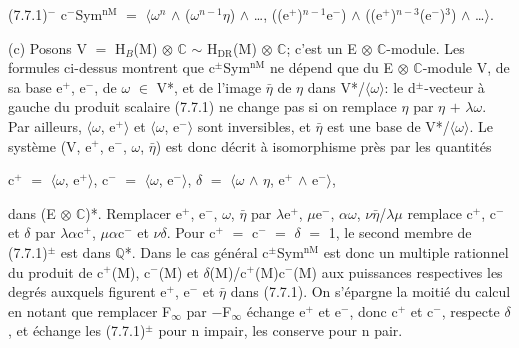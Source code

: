 \documentclass[10pt,twoside]{article}
\begin{document}
(7.7.1)\ensuremath{^{−}}    c\ensuremath{^{-}}Sym\ensuremath{^{\mathrm{nM}}} \ensuremath{=} \ensuremath{⟨}\ensuremath{ω}\ensuremath{^{n}} \ensuremath{∧} (\ensuremath{ω}\ensuremath{^{n−1}}\ensuremath{η}) \ensuremath{∧} …, ((e\ensuremath{^{+}})\ensuremath{^{n−1}}e\ensuremath{^{-}}) \ensuremath{∧} ((e\ensuremath{^{+}})\ensuremath{^{n−3}}(e\ensuremath{^{-}})\ensuremath{^{3}}) \ensuremath{∧} …\ensuremath{⟩}.\par
(c) Posons V \ensuremath{=} H\ensuremath{_{B}}(M) \ensuremath{⊗} \ensuremath{ℂ} \ensuremath{∼} H\ensuremath{_{\mathrm{DR}}}(M) \ensuremath{⊗} \ensuremath{ℂ}; c’est un E \ensuremath{⊗} \ensuremath{ℂ}-module. Les formules ci-dessus montrent que c\ensuremath{^{±}}Sym\ensuremath{^{\mathrm{nM}}} ne dépend que du E \ensuremath{⊗} \ensuremath{ℂ}-module V, de sa base e\ensuremath{^{+}}, e\ensuremath{^{-}}, de \ensuremath{ω} \ensuremath{∈} V*, et de l’image \ensuremath{\bar{η}} de \ensuremath{η} dans V*/\ensuremath{⟨}\ensuremath{ω}\ensuremath{⟩}: le d\ensuremath{^{±}}-vecteur à gauche du produit scalaire (7.7.1) ne change pas si on remplace \ensuremath{η} par \ensuremath{η} \ensuremath{+} \ensuremath{λ}\ensuremath{ω}. Par ailleurs, \ensuremath{⟨}\ensuremath{ω}, e\ensuremath{^{+}}\ensuremath{⟩} et \ensuremath{⟨}\ensuremath{ω}, e\ensuremath{^{-}}\ensuremath{⟩} sont inversibles, et \ensuremath{\bar{η}} est une base de V*/\ensuremath{⟨}\ensuremath{ω}\ensuremath{⟩}. Le système (V, e\ensuremath{^{+}}, e\ensuremath{^{-}}, \ensuremath{ω}, \ensuremath{\bar{η}}) est donc décrit à isomorphisme près par les quantités\par
c\ensuremath{^{+}} \ensuremath{=} \ensuremath{⟨}\ensuremath{ω}, e\ensuremath{^{+}}\ensuremath{⟩},   c\ensuremath{^{-}} \ensuremath{=} \ensuremath{⟨}\ensuremath{ω}, e\ensuremath{^{-}}\ensuremath{⟩},   \ensuremath{δ} \ensuremath{=} \ensuremath{⟨}\ensuremath{ω} \ensuremath{∧} \ensuremath{η}, e\ensuremath{^{+}} \ensuremath{∧} e\ensuremath{^{-}}\ensuremath{⟩},\par
dans (E \ensuremath{⊗} \ensuremath{ℂ})*. Remplacer e\ensuremath{^{+}}, e\ensuremath{^{-}}, \ensuremath{ω}, \ensuremath{\bar{η}} par \ensuremath{λ}e\ensuremath{^{+}}, \ensuremath{μ}e\ensuremath{^{-}}, \ensuremath{α}\ensuremath{ω}, \ensuremath{ν}\ensuremath{\bar{η}}/\ensuremath{λ}\ensuremath{μ} remplace c\ensuremath{^{+}}, c\ensuremath{^{-}} et \ensuremath{δ} par \ensuremath{λ}\ensuremath{α}c\ensuremath{^{+}}, \ensuremath{μ}\ensuremath{α}c\ensuremath{^{-}} et \ensuremath{ν}\ensuremath{δ}. Pour c\ensuremath{^{+}} \ensuremath{=} c\ensuremath{^{-}} \ensuremath{=} \ensuremath{δ} \ensuremath{=} 1, le second membre de (7.7.1)\ensuremath{^{±}} est dans \ensuremath{ℚ}*. Dans le cas général c\ensuremath{^{±}}Sym\ensuremath{^{\mathrm{nM}}} est donc un multiple rationnel du produit de c\ensuremath{^{+}}(M), c\ensuremath{^{-}}(M) et \ensuremath{δ}(M)/c\ensuremath{^{+}}(M)c\ensuremath{^{-}}(M) aux puissances respectives les degrés auxquels figurent e\ensuremath{^{+}}, e\ensuremath{^{-}} et \ensuremath{\bar{η}} dans (7.7.1). On s’épargne la moitié du calcul en notant que remplacer F\ensuremath{_{∞}} par \ensuremath{−}F\ensuremath{_{∞}} échange e\ensuremath{^{+}} et e\ensuremath{^{-}}, donc c\ensuremath{^{+}} et c\ensuremath{^{-}}, respecte \ensuremath{δ}, et échange les (7.7.1)\ensuremath{^{±}} pour n impair, les conserve pour n pair.\par
\end{document}

